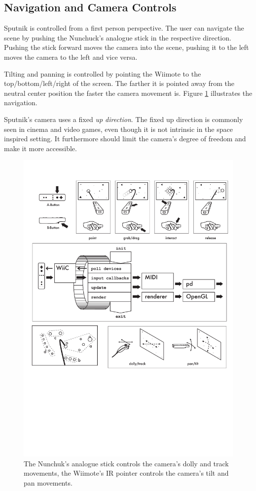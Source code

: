 \documentclass[10pt,a4paper]{scrartcl}
\begin{document}
\subsection{Navigation and Camera Controls}
Sputnik is controlled from a first person perspective. The user can navigate the scene by pushing the Nunchuck's analogue stick in the respective direction. Pushing the stick forward moves the camera into the scene, pushing it to the left moves the camera to the left and vice versa.

Tilting and panning is controlled by pointing the Wiimote to the top/bottom/left/right of the screen. The farther it is pointed away from the neutral center position the faster the camera movement is. Figure \ref{fig:sputnik-navigation} illustrates the navigation.

Sputnik's camera uses a fixed \emph{up direction}. The fixed up direction is commonly seen in cinema and video games, even though it is not intrinsic in the space inspired setting. It furthermore should limit the camera's degree of freedom and make it more accessible.

\begin{figure}[hbtp]
\begin{center}
\includegraphics[width=0.85\columnwidth]{img/navigation}
\caption{The Nunchuk's analogue stick controls the camera's dolly and track movements, the Wiimote's IR pointer controls the camera's tilt and pan movements.}
\label{fig:sputnik-navigation}
\end{center}
\end{figure}
\end{document}
